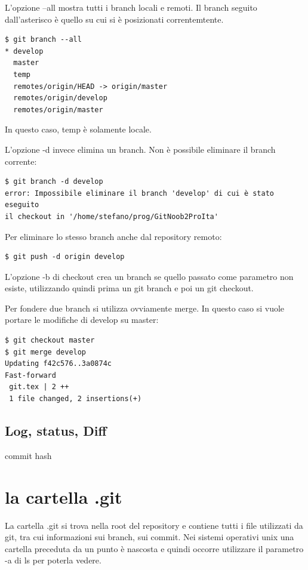 \documentclass{article} \usepackage[textwidth=18cm,textheight=18cm]{geometry}
\begin{document}
L'opzione --all mostra tutti i branch locali e remoti. Il branch seguito
dall'asterisco è quello su cui si è posizionati correntemtente.

\begin{verbatim}
$ git branch --all
* develop
  master
  temp
  remotes/origin/HEAD -> origin/master
  remotes/origin/develop
  remotes/origin/master
\end{verbatim}

In questo caso, temp è solamente locale.

L'opzione -d invece elimina un branch. Non è possibile eliminare il branch corrente:

\begin{verbatim}
$ git branch -d develop
error: Impossibile eliminare il branch 'develop' di cui è stato eseguito 
il checkout in '/home/stefano/prog/GitNoob2ProIta'
\end{verbatim}

Per eliminare lo stesso branch anche dal repository remoto:

\begin{verbatim}
$ git push -d origin develop
\end{verbatim}

L'opzione -b di checkout crea un branch se quello passato come parametro non
esiste, utilizzando quindi prima un git branch e poi un git checkout.

Per fondere due branch si utilizza ovviamente merge. In questo caso si vuole
portare le modifiche di develop su master:

\begin{verbatim}
$ git checkout master
$ git merge develop
Updating f42c576..3a0874c
Fast-forward
 git.tex | 2 ++
 1 file changed, 2 insertions(+)
\end{verbatim}

\subsection{Log, status, Diff}

commit hash

\section{la cartella .git}

La cartella .git si trova nella root del repository e contiene tutti i file
utilizzati da git, tra cui informazioni sui branch, sui commit. Nei sistemi
operativi unix una cartella preceduta da un punto è nascosta e quindi occorre
utilizzare il parametro -a di ls per poterla vedere.
\end{document}
